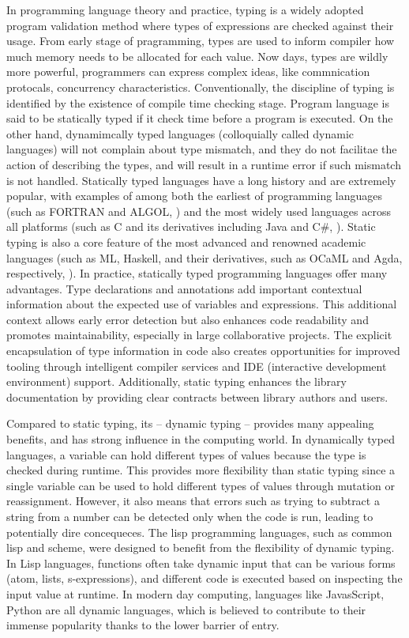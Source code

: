 In programming language theory and practice, typing is a widely adopted program validation method where types of expressions are checked against their usage. From early stage of pragramming, types are used to inform compiler how much memory needs to be allocated for each value. Now days, types are wildly more powerful, programmers can express complex ideas, like commnication protocals, concurrency characteristics. Conventionally, the discipline of typing is identified by the existence of compile time checking stage. Program language is said to be statically typed if it check time before a program is executed.  On the other hand, dynamimcally typed languages (colloquially called dynamic languages) will not complain about type mismatch, and they do not facilitae the action of describing the types, and will result in a runtime error if such mismatch is not handled. Statically typed languages have a long history and are extremely popular, with examples of among both the earliest of programming languages (such as FORTRAN and ALGOL, \cite{Backus1978-xt}) and the most widely used languages across all platforms  (such as C and its derivatives including Java and C\#, \cite{Ritchie1978-pa}). Static typing is also a core feature of the most advanced and renowned academic languages (such as ML, Haskell, and their derivatives, such as OCaML and Agda, respectively, \cite{Hudak2007-kn}). In practice, statically typed programming languages offer many advantages. Type declarations and annotations add important contextual information about the expected use of variables and expressions. This additional context allows early error detection but also enhances code readability and promotes maintainability, especially in large collaborative projects. The explicit encapsulation of type information in code also creates opportunities for improved tooling through intelligent compiler services and IDE (interactive development environment) support. Additionally, static typing enhances the library documentation by providing clear contracts between library authors and users.


Compared to static typing, its – dynamic typing – provides many appealing benefits, and has strong influence in the computing world. In dynamically typed languages, a variable can hold different types of values because the type is checked during runtime. This provides more flexibility than static typing since a single variable can be used to hold different types of values through mutation or reassignment. However, it also means that errors such as trying to subtract a string from a number can be detected only when the code is run, leading to potentially dire concequeces. The lisp programming languages, such as common lisp and scheme, were designed to benefit from the flexibility of dynamic typing. In Lisp languages, functions often take dynamic input that can be various forms (atom, lists, s-expressions), and different code is executed based on inspecting the input value at runtime. In modern day computing,  languages like JavasScript, Python are all dynamic languages, which is believed to contribute to their immense popularity thanks to the lower barrier of entry.


